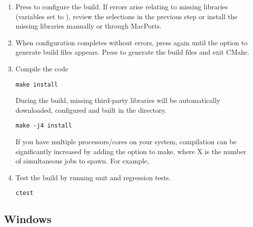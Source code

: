 \begin{enumerate}
    \item Press  to configure the build. If errors arise relating to
        missing libraries (variables set to ), review the
         selections in the previous
    step or install the missing libraries manually or through MacPorts.

    \item When configuration completes without errors, press  again
    until the option  to generate build files appears. Press 
    to generate the build files and exit CMake.

    \item Compile the code
    \begin{lstlisting}[style=BashInputStyle]
        make install
    \end{lstlisting}
    During the build, missing third-party libraries will be automatically
    downloaded, configured and built in the \nekpp {} directory.

    \newsavebox\installationMacTip
    \begin{lrbox}{\installationMacTip}\begin{minipage}{0.8\linewidth}
    \begin{lstlisting}[style=BashInputStyle]
    make -j4 install
    \end{lstlisting}
    \end{minipage}
    \end{lrbox}

    \begin{tipbox}
    If you have multiple processors/cores on your system, compilation can be
    significantly increased by adding the  option to make, where X is
    the number of simultaneous jobs to spawn. For example,
    \noindent\usebox\installationMacTip
    \end{tipbox}

    \item Test the build by running unit and regression tests.
    \begin{lstlisting}[style=BashInputStyle]
    ctest
    \end{lstlisting}
\end{enumerate}

\subsection{Windows}

